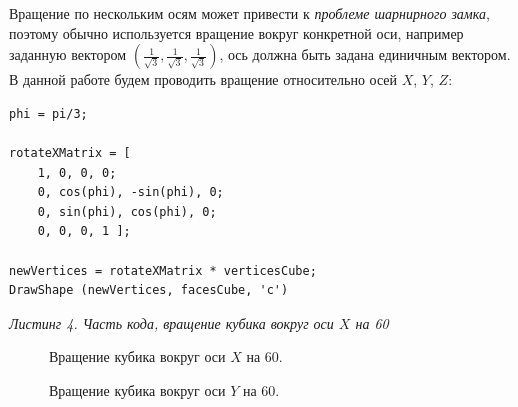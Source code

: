 \documentclass[a5paper, 10pt]{article}
\theoremstyle{definition}
\theoremstyle{plain}
\theoremstyle{remark}
\begin{document}
Вращение по нескольким осям может привести к \textit{проблеме шарнирного замка}, поэтому обычно используется вращение вокруг конкретной оси, например заданную вектором $ \left( \frac{1}{\sqrt{3}}, \frac{1}{\sqrt{3}}, \frac{1}{\sqrt{3}} \right) $, ось должна быть задана единичным вектором.\\
В данной работе будем проводить вращение относительно осей  $X$,  $Y$,  $Z$:

\begin{center}
\begin{lstlisting}
phi = pi/3;

rotateXMatrix = [
    1, 0, 0, 0;
    0, cos(phi), -sin(phi), 0;
    0, sin(phi), cos(phi), 0;
    0, 0, 0, 1 ];

newVertices = rotateXMatrix * verticesCube;
DrawShape (newVertices, facesCube, 'c')
\end{lstlisting}
\textit{Листинг 4. Часть кода, вращение кубика вокруг оси $X$ на 60\textdegree}
\end{center}

\begin{figure}[h!]
\caption{Вращение кубика вокруг оси $X$ на 60\textdegree.}
\end{figure}

\begin{figure}[h!]
\caption{Вращение кубика вокруг оси $Y$ на 60\textdegree.}
\end{figure}
\end{document}
